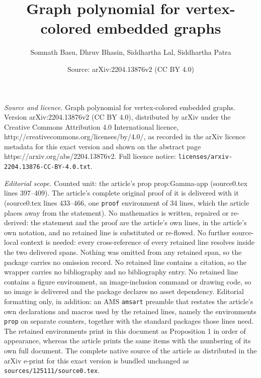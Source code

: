 \documentclass[10pt,a4paper]{amsart}
\title{Graph polynomial for vertex-colored embedded graphs}
\author{Somnath Basu, Dhruv Bhasin, Siddhartha Lal, Siddhartha Patra}
\date{Source: arXiv:2204.13876v2 (CC BY 4.0)}
\begin{document}
\maketitle

\noindent\emph{Source and licence.} Graph polynomial for vertex-colored embedded graphs. Version arXiv:2204.13876v2 (CC BY 4.0), distributed by arXiv under the Creative Commons Attribution 4.0 International licence, http://creativecommons.org/licenses/by/4.0/, as recorded in the arXiv licence metadata for this exact version and shown on the abstract page https://arxiv.org/abs/2204.13876v2. Full licence notice: \texttt{licenses/arxiv-2204.13876-CC-BY-4.0.txt}.\par\smallskip

\noindent\textit{Editorial scope.} Counted unit: the article's prop prop:Gamma-app (source0.tex lines 397--409). The article's complete original proof of it is delivered with it (source0.tex lines 433--466, one \texttt{proof} environment of 34 lines, which the article places away from the statement). No mathematics is written, repaired or re-derived: the statement and the proof are the article's own lines, in the article's own notation, and no retained line is substituted or re-flowed.  No further source-local context is needed: every cross-reference of every retained line resolves inside the two delivered spans.  Nothing was omitted from any retained span, so the package carries no omission record.  No retained line contains a citation, so the wrapper carries no bibliography and no bibliography entry.  No retained line contains a figure environment, an image-inclusion command or drawing code, so no image is delivered and the package declares no asset dependency.  Editorial formatting only, in addition: an AMS \texttt{amsart} preamble that restates the article's own declarations and macros used by the retained lines, namely the environments \texttt{prop} on separate counters, together with the standard packages those lines need.  The retained environments print in this document as Proposition 1 in order of appearance, whereas the article prints the same items with the numbering of its own full document.  The complete native source of the article as distributed in the arXiv e-print for this exact version is bundled unchanged as \texttt{sources/125111/source0.tex}.
\end{document}
